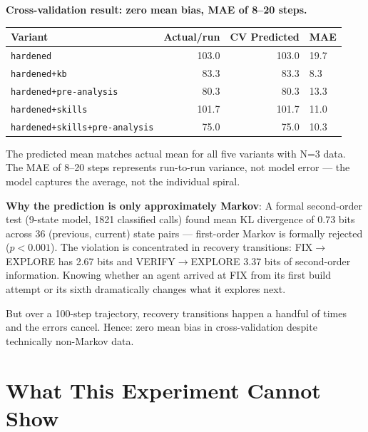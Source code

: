 \documentclass[11pt,a4paper]{article}
\begin{document}
\begin{findingbox}
\textbf{Cross-validation result: zero mean bias, MAE of 8--20 steps.}

\begin{center}
\begin{tabular}{@{}lrrl@{}}
\toprule
\textbf{Variant} & \textbf{Actual/run} & \textbf{CV Predicted} & \textbf{MAE} \\
\midrule
\texttt{hardened}            & 103.0 & 103.0 & 19.7 \\
\texttt{hardened+kb}         &  83.3 &  83.3 &  8.3 \\
\texttt{hardened+pre-analysis}        &  80.3 &  80.3 & 13.3 \\
\texttt{hardened+skills}     & 101.7 & 101.7 & 11.0 \\
\texttt{hardened+skills+pre-analysis} &  75.0 &  75.0 & 10.3 \\
\bottomrule
\end{tabular}
\end{center}
\end{findingbox}

The predicted mean matches actual mean for all five variants with N=3 data.
The MAE of 8--20 steps represents run-to-run variance, not model error ---
the model captures the average, not the individual spiral.

\textbf{Why the prediction is only approximately Markov}:
A formal second-order test (9-state model, 1821 classified calls) found mean KL
divergence of 0.73 bits across 36 (previous, current) state pairs ---
first-order Markov is formally rejected ($p < 0.001$).
The violation is concentrated in recovery transitions:
FIX$\to$EXPLORE has 2.67 bits and VERIFY$\to$EXPLORE 3.37 bits of second-order information.
Knowing whether an agent arrived at FIX from its first build attempt or its
sixth dramatically changes what it explores next.

But over a 100-step trajectory, recovery transitions happen a handful of times
and the errors cancel. Hence: zero mean bias in cross-validation despite
technically non-Markov data.

\section{What This Experiment Cannot Show}
\label{sec:limits}
\end{document}
